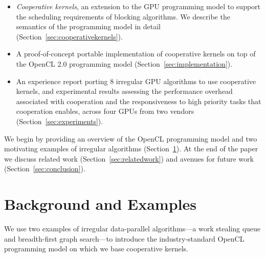 \documentclass[nocopyrightspace,10pt]{sigplanconf}
\newcommand{\NumAlgorithms}{8}
\begin{document}
\begin{itemize}

\item \emph{Cooperative kernels}, an extension to the GPU programming model to support the scheduling requirements of blocking algorithms.  We describe the semantics of the programming model in detail (Section~\ref{sec:cooperativekernels}). 

\item A proof-of-concept portable implementation of cooperative
  kernels on top of the OpenCL 2.0 programming model
  (Section~\ref{sec:implementation}).

\item An experience report porting \NumAlgorithms{} irregular GPU
  algorithms to use cooperative kernels, and experimental results
  assessing the performance overhead associated with cooperation and
  the responsiveness to high priority tasks that cooperation enables,
  across four GPUs from two vendors (Section~\ref{sec:experiments}).

\end{itemize}

We begin by providing an overview of the OpenCL programming model and
two motivating examples of irregular algorithms (Section~\ref{sec:background}).  At the end of the paper we discuss related work (Section~\ref{sec:relatedwork}) and avenues for future work (Section~\ref{sec:conclusion}).

\section{Background and Examples}\label{sec:background}

We use two examples of irregular data-parallel algorithms---a work
stealing queue and breadth-first graph search---to introduce the
industry-standard OpenCL programming model on which we base cooperative
kernels.

\end{document}
